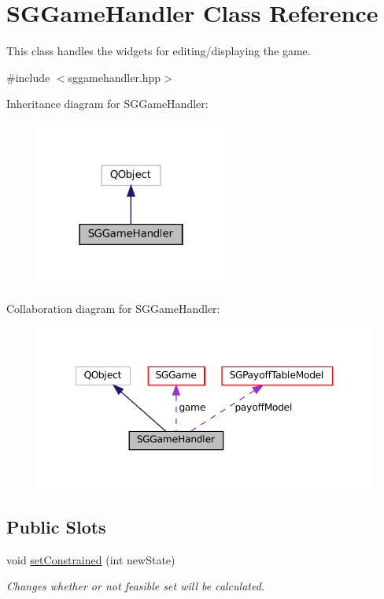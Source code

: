 \hypertarget{classSGGameHandler}{}\section{S\+G\+Game\+Handler Class Reference}
\label{classSGGameHandler}


This class handles the widgets for editing/displaying the game.  




{\ttfamily \#include $<$sggamehandler.\+hpp$>$}



Inheritance diagram for S\+G\+Game\+Handler\+:
\nopagebreak
\begin{figure}[H]
\begin{center}
\leavevmode
\includegraphics[width=178pt]{classSGGameHandler__inherit__graph}
\end{center}
\end{figure}


Collaboration diagram for S\+G\+Game\+Handler\+:
\nopagebreak
\begin{figure}[H]
\begin{center}
\leavevmode
\includegraphics[width=347pt]{classSGGameHandler__coll__graph}
\end{center}
\end{figure}
\subsection*{Public Slots}
\begin{DoxyCompactItemize}
\item 
\mbox{\label{classSGGameHandler_a1497e55ccf5e4a21f22f0326b5ccc2cc}} 
void \hyperlink{classSGGameHandler_a1497e55ccf5e4a21f22f0326b5ccc2cc}{set\+Constrained} (int new\+State)
\begin{DoxyCompactList}\small\item\em Changes whether or not feasible set will be calculated. \end{DoxyCompactList}\end{DoxyCompactItemize}
